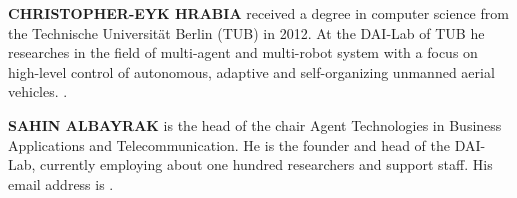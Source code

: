 \documentclass{scspaperproc}
\theoremstyle{scsthe}
\begin{document}
\uppercase{\textbf{Christopher-Eyk Hrabia}} received a degree in computer science from the Technische Universität Berlin (TUB) in 2012. At the DAI-Lab of TUB he researches in the field of multi-agent and multi-robot system with a focus on high-level control of autonomous, adaptive and self-organizing unmanned aerial vehicles. .

\uppercase{\textbf{Sahin Albayrak}} is the head of the chair Agent Technologies in Business
Applications and Telecommunication. He is the founder and head of the DAI-Lab, currently employing about one hundred researchers and support staff. His email address is .

%
%
%
\end{document}
